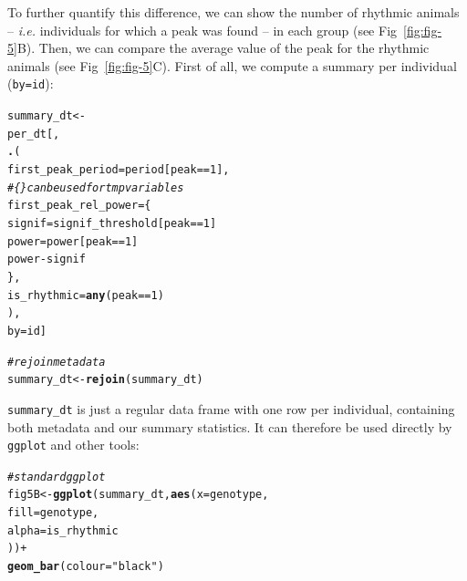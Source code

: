 \documentclass[10pt,letterpaper]{article}\usepackage[]{graphicx}\usepackage[]{color}
\makeatletter
\newcommand{\hlnum}[1]{\textcolor[rgb]{0.686,0.059,0.569}{#1}}%
\newcommand{\hlstr}[1]{\textcolor[rgb]{0.192,0.494,0.8}{#1}}%
\newcommand{\hlcom}[1]{\textcolor[rgb]{0.678,0.584,0.686}{\textit{#1}}}%
\newcommand{\hlopt}[1]{\textcolor[rgb]{0,0,0}{#1}}%
\newcommand{\hlstd}[1]{\textcolor[rgb]{0.345,0.345,0.345}{#1}}%
\newcommand{\hlkwb}[1]{\textcolor[rgb]{0.69,0.353,0.396}{#1}}%
\newcommand{\hlkwc}[1]{\textcolor[rgb]{0.333,0.667,0.333}{#1}}%
\newcommand{\hlkwd}[1]{\textcolor[rgb]{0.737,0.353,0.396}{\textbf{#1}}}%
\newenvironment{kframe}{%
 \def\at@end@of@kframe{}%
 \ifinner\ifhmode%
  \def\at@end@of@kframe{\end{minipage}}%
  \begin{minipage}{\columnwidth}%
 \fi\fi%
 \def\FrameCommand##1{\hskip\@totalleftmargin \hskip-\fboxsep
 \colorbox{shadecolor}{##1}\hskip-\fboxsep
     \hskip-\linewidth \hskip-\@totalleftmargin \hskip\columnwidth}%
 \MakeFramed {\advance\hsize-\width
   \@totalleftmargin\z@ \linewidth\hsize
   \@setminipage}}%
 {\par\unskip\endMakeFramed%
 \at@end@of@kframe}
\newenvironment{knitrout}{}{} %
\makeatother
\begin{document}
To further quantify this difference, we can show the number of rhythmic animals -- \emph{i.e.} individuals for which a peak was found -- in each group (see Fig~\ref{fig:fig-5}B).
Then, we can compare the average value of the peak for the rhythmic animals (see Fig~\ref{fig:fig-5}C).
First of all, we compute a summary per individual (\texttt{by=id}):

\begin{knitrout}
\color{fgcolor}\begin{kframe}
\begin{alltt}
\hlstd{summary_dt} \hlkwb{<-}
    \hlstd{per_dt[,}
          \hlkwd{.}\hlstd{(}
           \hlkwc{first_peak_period} \hlstd{= period[peak} \hlopt{==} \hlnum{1}\hlstd{],}
            \hlcom{# \{\} can be used for tmp variables}
           \hlkwc{first_peak_rel_power} \hlstd{= \{}
             \hlstd{signif} \hlkwb{=} \hlstd{signif_threshold[peak} \hlopt{==} \hlnum{1}\hlstd{]}
             \hlstd{power} \hlkwb{=} \hlstd{power[peak} \hlopt{==} \hlnum{1}\hlstd{]}
             \hlstd{power} \hlopt{-} \hlstd{signif}
            \hlstd{\},}
           \hlkwc{is_rhythmic} \hlstd{=} \hlkwd{any}\hlstd{(peak} \hlopt{==} \hlnum{1}\hlstd{)}
           \hlstd{),}
           \hlkwc{by}\hlstd{=id]}

\hlcom{# rejoin metadata}
\hlstd{summary_dt} \hlkwb{<-} \hlkwd{rejoin}\hlstd{(summary_dt)}
\end{alltt}
\end{kframe}
\end{knitrout}

\texttt{summary\_dt} is just a regular data frame with one row per individual, containing both metadata and our summary statistics. It can therefore be used directly by \texttt{ggplot} and other tools:

\begin{knitrout}
\color{fgcolor}\begin{kframe}
\begin{alltt}
\hlcom{# standard ggplot}
\hlstd{fig5B} \hlkwb{<-} \hlkwd{ggplot}\hlstd{(summary_dt,} \hlkwd{aes}\hlstd{(}\hlkwc{x} \hlstd{= genotype,}
                                \hlkwc{fill} \hlstd{= genotype,}
                                \hlkwc{alpha} \hlstd{= is_rhythmic}
                                \hlstd{))} \hlopt{+}
              \hlkwd{geom_bar}\hlstd{(}\hlkwc{colour}\hlstd{=}\hlstr{"black"}\hlstd{)}
\end{alltt}
\end{kframe}
\end{knitrout}
\end{document}
